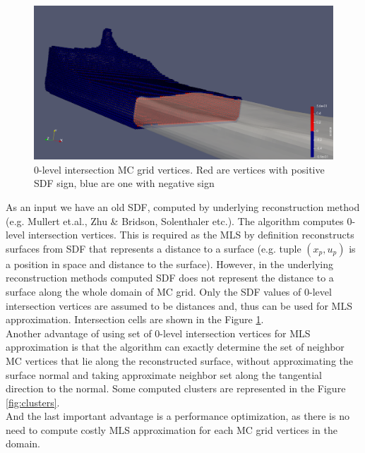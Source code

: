\begin{figure}[H]
	\begin{center}
		\includegraphics[width=\textwidth]{figures/MlsIntersectionVertexSet.png}
	\end{center}
	\caption{0-level intersection MC grid vertices. Red are vertices with positive SDF sign, blue are one with negative sign}
	\label{fig:intersection_vertices}
\end{figure}
As an input we have an old SDF, computed by underlying reconstruction method (e.g. Mullert et.al., Zhu \& Bridson, Solenthaler etc.). The algorithm computes 0-level intersection vertices. This is required as the MLS by definition reconstructs surfaces from SDF that represents a distance to a surface (e.g. tuple $(x_p, u_p)$ is a position in space and distance to the surface). However, in the underlying reconstruction methods computed SDF does not represent the distance to a surface along the whole domain of MC grid. Only the SDF values of 0-level intersection vertices are assumed to be distances and, thus can be used for MLS approximation. Intersection cells are shown in the Figure \ref{fig:intersection_vertices}.\\

Another advantage of using set of 0-level intersection vertices for MLS approximation is that the algorithm can exactly determine the set of neighbor MC vertices that lie along the reconstructed surface, without approximating the surface normal and taking approximate neighbor set along the tangential direction to the normal. Some computed clusters are represented in the Figure \ref{fig:clusters}.\\

And the last important advantage is a performance optimization, as there is no need to compute costly MLS approximation for each MC grid vertices in the domain.\\

